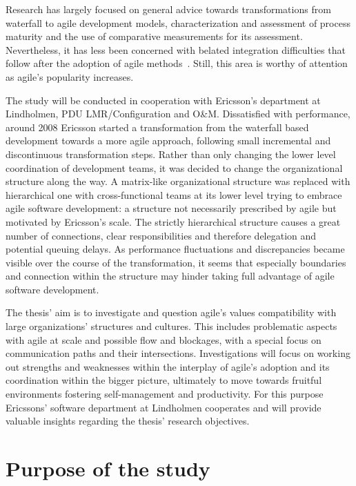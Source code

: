 \documentclass[paper=a4, fontsize=11pt]{scrartcl}
\numberwithin{equation}{section}		%
\numberwithin{figure}{section}			%
\numberwithin{table}{section}			%
\begin{document}
Research has largely focused on general advice towards transformations from waterfall to agile development models, characterization and assessment of process maturity and the use of comparative measurements for its assessment. Nevertheless, it has less been concerned with belated integration difficulties that follow after the adoption of agile methods~\citep{ivari2011orgagile}. Still, this area is worthy of attention as agile's popularity increases.

The study will be conducted in cooperation with Ericsson's department at Lindholmen, PDU LMR/Configuration and O\&M. Dissatisfied with performance, around 2008 Ericsson started a transformation from the waterfall based development towards a more agile approach, following small incremental and discontinuous transformation steps. Rather than only changing the lower level coordination of development teams, it was decided to change the organizational structure along the way. A matrix-like organizational structure was replaced with hierarchical one with cross-functional teams at its lower level trying to embrace agile software development: a structure not necessarily prescribed by agile but motivated by Ericsson's scale.
The strictly hierarchical structure causes a great number of connections, clear responsibilities and therefore delegation and potential queuing delays. As performance fluctuations and discrepancies became visible over the course of the transformation, it seems that especially boundaries and connection within the structure may hinder taking full advantage of agile software development.

The thesis' aim is to investigate and question agile's values compatibility with large organizations' structures and cultures. This includes problematic aspects with agile at scale and possible flow and blockages, with a special focus on communication paths and their intersections. Investigations will focus on working out strengths and weaknesses within the interplay of agile's adoption and its coordination within the bigger picture, ultimately to move towards fruitful environments fostering self-management and productivity. For this purpose Ericssons' software department at Lindholmen cooperates and will provide valuable insights regarding the thesis' research objectives.

\section{Purpose of the study}
\end{document}
